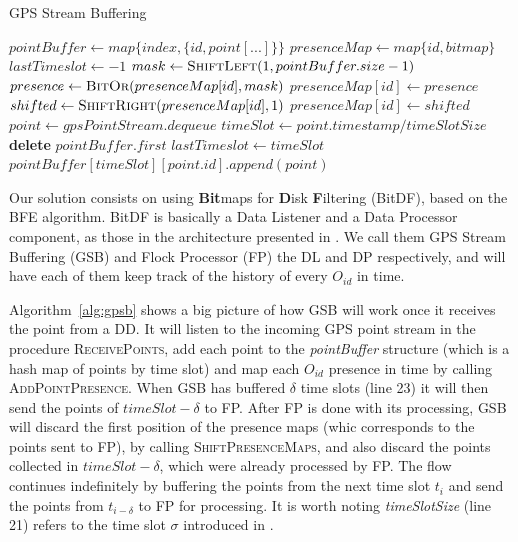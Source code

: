 \begin{algorithm}[h!]
\caption{GPS Stream Buffering}
\label{alg:gpsb}
\begin{algorithmic}[1]
    \State $pointBuffer \gets map\{index, \{id, point[...]\}\}$
    \State $presenceMap \gets map\{id, bitmap\}$
    \State $lastTimeslot \gets -1$
    \State
        \State $mask \gets \Call{ShiftLeft}{1, pointBuffer.size - 1}$
        \State $presence \gets \Call{BitOr}{presenceMap[id], mask}$
        \State $presenceMap[id] \gets presence$
    \EndProcedure
    \State
            \State $shifted \gets \Call{ShiftRight}{presenceMap[id], 1}$
            \State $presenceMap[id] \gets shifted$
        \EndFor
    \EndProcedure
    \State
        \Loop
            \State $point \gets gpsPointStream.dequeue$
            \State $timeSlot \gets point.timestamp / timeSlotSize$
                    \State {}
                    \State \textbf{delete} $pointBuffer.first$
                    \State {}
                \EndIf
                \State $lastTimeslot \gets timeSlot$
            \EndIf
            \State $pointBuffer[timeSlot][point.id].append(point)$
            \State {}
        \EndLoop
    \EndProcedure
\end{algorithmic}
\end{algorithm}

Our solution consists on using \textbf{Bit}maps for \textbf{D}isk \textbf{F}iltering (BitDF), based on the BFE
algorithm. BitDF is basically a Data Listener and a Data Processor component, as those in the architecture presented in
. We call them GPS Stream Buffering (GSB) and Flock Processor (FP) the DL and DP respectively,
and will have each of them keep track of the history of every $O_{id}$ in time.

Algorithm~\ref{alg:gpsb} shows a big picture of how GSB will work once it receives the point from a DD. It will listen
to the incoming GPS point stream in the procedure \textsc{ReceivePoints}, add each point to the \textit{pointBuffer}
structure (which is a hash map of points by time slot) and map each $O_{id}$ presence in time by calling
\textsc{AddPointPresence}. When GSB has buffered $\delta$ time slots (line 23) it will then send the points of $timeSlot
- \delta$ to FP. After FP is done with its processing, GSB will discard the first position of the presence maps (whic
corresponds to the points sent to FP), by calling \textsc{ShiftPresenceMaps}, and also discard the points collected in
$timeSlot - \delta$, which were already processed by FP. The flow continues indefinitely by buffering the points from
the next time slot $t_i$ and send the points from $t_{i - \delta}$ to FP for processing. It is worth noting
\textit{timeSlotSize} (line 21) refers to the time slot $\sigma$ introduced in .

